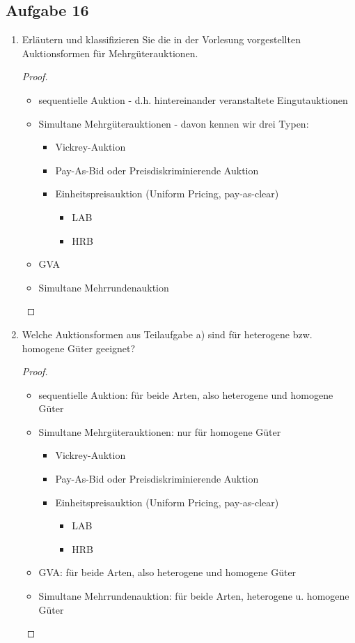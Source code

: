 \documentclass[12pt]{extreport} %
\theoremstyle{named}
\theoremstyle{nnamed}
\theoremstyle{itshape}
\theoremstyle{normal}
\begin{document}
\subsection*{Aufgabe 16}

\begin{enumerate}
	\item Erläutern und klassifizieren Sie die in der Vorlesung vorgestellten Auktionsformen für Mehrgüterauktionen.
		\begin{proof} ~\
		  \begin{itemize}
			\item sequentielle Auktion - d.h. hintereinander veranstaltete Eingutauktionen
			\item Simultane Mehrgüterauktionen - davon kennen wir drei Typen:
				\begin{itemize}
					\item Vickrey-Auktion
					\item Pay-As-Bid oder Preisdiskriminierende Auktion
					\item Einheitspreisauktion (Uniform Pricing, pay-as-clear)
						\begin{itemize}
							\item LAB
							\item HRB
						\end{itemize}
				\end{itemize}
			\item GVA
			\item Simultane Mehrrundenauktion
		  \end{itemize}
		\end{proof}
	\item Welche Auktionsformen aus Teilaufgabe a) sind für heterogene bzw. homogene Güter geeignet?
		\begin{proof} ~\
		  \begin{itemize}
			\item sequentielle Auktion: für beide Arten, also heterogene und homogene Güter
			\item Simultane Mehrgüterauktionen: nur für homogene Güter
				\begin{itemize}
					\item Vickrey-Auktion
					\item Pay-As-Bid oder Preisdiskriminierende Auktion
					\item Einheitspreisauktion (Uniform Pricing, pay-as-clear)
						\begin{itemize}
							\item LAB
							\item HRB
						\end{itemize}
				\end{itemize}
			\item GVA: für beide Arten, also heterogene und homogene Güter
			\item Simultane Mehrrundenauktion: für beide Arten, heterogene u. homogene Güter
		  \end{itemize}
		\end{proof}
\end{enumerate}
\end{document}
